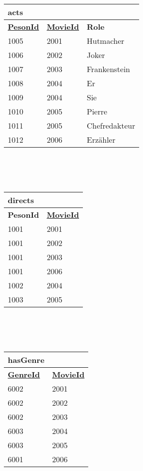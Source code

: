 \documentclass[a4paper]{article}
\begin{document}
\begin{tabular}{|l|l|l|}
\hline
\textbf{acts} & &\\
\hline
\textbf{\uline{PesonId}} & \textbf{\uline{MovieId}} & \textbf{Role}\\
\hline
1005 & 2001 & Hutmacher\\
\hline
1006 & 2002 & Joker \\
\hline
1007 & 2003 & Frankenstein \\
\hline
1008 & 2004 & Er \\
\hline
1009 & 2004 & Sie \\
\hline
1010 & 2005 & Pierre \\
\hline
1011 & 2005 & Chefredakteur \\
\hline
1012 & 2006 & Erzähler \\
\hline

\end{tabular}\\
\\
\\
\begin{tabular}{|l|l|}
\hline
\textbf{directs} & \\
\hline
\textbf{PesonId} & \textbf{\uline{MovieId}}\\
\hline
1001 & 2001 \\
\hline
1001 & 2002 \\
\hline
1001 & 2003 \\
\hline
1001 & 2006 \\
\hline
1002 & 2004 \\
\hline
1003 & 2005 \\
\hline

\end{tabular}\\
\\
\\
\begin{tabular}{|l|l|}
\hline
\textbf{hasGenre} &\\
\hline
\textbf{\uline{GenreId}} & \textbf{\uline{MovieId}}\\
\hline
6002 & 2001 \\
\hline
6002 & 2002 \\
\hline
6002 & 2003 \\
\hline
6003 & 2004 \\
\hline
6003 & 2005 \\
\hline
6001 & 2006 \\
\hline

\end{tabular}\\
\\
\\
\end{document}

